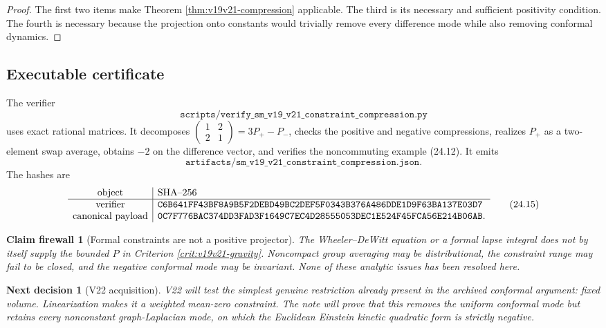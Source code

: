 \documentclass[11pt]{article}
\newtheorem{firewall}[theorem]{Claim firewall}
\newtheorem{decision}[theorem]{Next decision}
\theoremstyle{remark}
\begin{document}
\begin{proof}
The first two items make Theorem \ref{thm:v19v21-compression} applicable.
The third is its necessary and sufficient positivity condition.  The
fourth is necessary because the projection onto constants would trivially
remove every difference mode while also removing conformal dynamics.
\end{proof}

\subsection{Executable certificate}

The verifier
\[
 \texttt{scripts/verify\_sm\_v19\_v21\_constraint\_compression.py}
                                                                  \tag{24.13}
\]
uses exact rational matrices.  It decomposes
\(\left(\begin{smallmatrix}1&2\\2&1\end{smallmatrix}\right)
=3P_+-P_-\), checks the positive and negative compressions, realizes
\(P_+\) as a two-element swap average, obtains \(-2\) on the difference
vector, and verifies the noncommuting example (24.12).  It emits
\[
 \texttt{artifacts/sm\_v19\_v21\_constraint\_compression.json}. \tag{24.14}
\]
The hashes are
\[
\begin{array}{c|l}
\hbox{object}&\hbox{SHA--256}\\ \hline
\hbox{verifier}&
\texttt{C6B641FF43BF8A9B5F2DEBD49BC2DEF5F0343B376A486DDE1D9F63BA137E03D7}\\
\hbox{canonical payload}&
\texttt{0C7F776BAC374DD3FAD3F1649C7EC4D28555053DEC1E524F45FCA56E214B06AB}.
\end{array}                                                     \tag{24.15}
\]

\begin{firewall}[Formal constraints are not a positive projector]
\label{fire:v19v21}
The Wheeler--DeWitt equation or a formal lapse integral does not by itself
supply the bounded \(P\) in Criterion \ref{crit:v19v21-gravity}.
Noncompact group averaging may be distributional, the constraint range
may fail to be closed, and the negative conformal mode may be invariant.
None of these analytic issues has been resolved here.
\end{firewall}

\begin{decision}[V22 acquisition]
\label{dec:v19v21-next}
V22 will test the simplest genuine restriction already present in the
archived conformal argument: fixed volume.  Linearization makes it a
weighted mean-zero constraint.  The note will prove that this removes the
uniform conformal mode but retains every nonconstant graph-Laplacian mode,
on which the Euclidean Einstein kinetic quadratic form is strictly
negative.
\end{decision}
\end{document}
